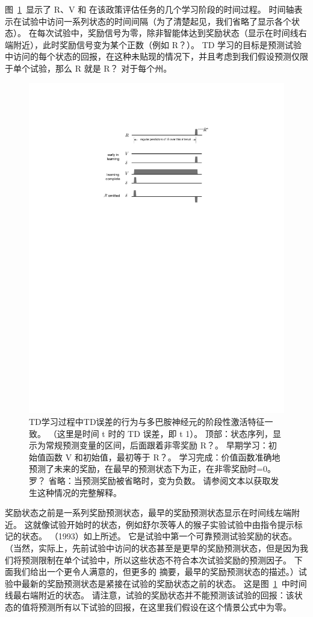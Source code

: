 {图~\ref{fig:12_5}~显示了 R、V 和 在该政策评估任务的几个学习阶段的时间过程。 
时间轴表示在试验中访问一系列状态的时间间隔（为了清楚起见，我们省略了显示各个状态）。
在每次试验中，奖励信号为零，除非智能体达到奖励状态（显示在时间线右端附近），此时奖励信号变为某个正数（例如 R？）。
TD 学习的目标是预测试验中访问的每个状态的回报，在这种未贴现的情况下，并且考虑到我们假设预测仅限于单个试验，那么 R 就是 R？ 对于每个州。


\begin{figure}[!htb]
	\centering
	\includegraphics[width=0.5\linewidth]{chap12/fig_12_5}
	\caption{TD学习过程中TD误差的行为与多巴胺神经元的阶段性激活特征一致。
		（这里是时间 t 时的 TD 误差，即 t 1）。
		顶部：状态序列，显示为常规预测变量的区间，后面跟着非零奖励 R？。
		早期学习：初始值函数 V 和初始值，最初等于 R？。
		学习完成：价值函数准确地预测了未来的奖励，在最早的预测状态下为正，在非零奖励时=0。
		罗？ 省略：当预测奖励被省略时，变为负数。
		请参阅文本以获取发生这种情况的完整解释。
		\label{fig:12_5}}
\end{figure}


奖励状态之前是一系列奖励预测状态，最早的奖励预测状态显示在时间线左端附近。
这就像试验开始时的状态，例如舒尔茨等人的猴子实验试验中由指令提示标记的状态。
（1993）如上所述。 它是试验中第一个可靠预测试验奖励的状态。
（当然，实际上，先前试验中访问的状态甚至是更早的奖励预测状态，但是因为我们将预测限制在单个试验中，所以这些状态不符合本次试验奖励的预测因子。
下面我们给出一个更令人满意的，但更多的 摘要，最早的奖励预测状态的描述。）试验中最新的奖励预测状态是紧接在试验的奖励状态之前的状态。
这是图~\ref{fig:12_5}~中时间线最右端附近的状态。
请注意，试验的奖励状态并不能预测该试验的回报：该状态的值将预测所有以下试验的回报，在这里我们假设在这个情景公式中为零。


}
